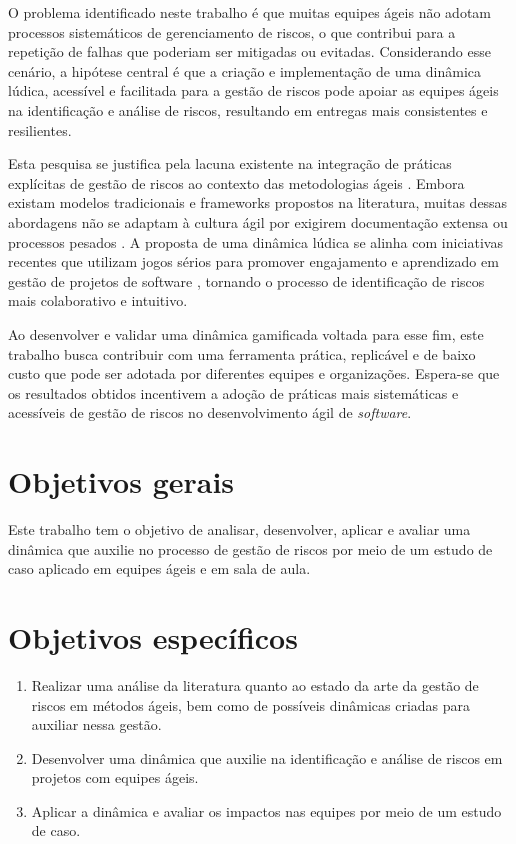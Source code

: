 \documentclass[
	12pt,
	openright,
	twoside,
	a4paper,
	english,
	brazil
	]{abntex2}
\begin{document}
O problema identificado neste trabalho é que muitas equipes ágeis não adotam processos sistemáticos de gerenciamento de riscos, o que contribui para a repetição de falhas que poderiam ser mitigadas ou evitadas. Considerando esse cenário, a hipótese central é que a criação e implementação de uma dinâmica lúdica, acessível e facilitada para a gestão de riscos pode apoiar as equipes ágeis na identificação e análise de riscos, resultando em entregas mais consistentes e resilientes.

Esta pesquisa se justifica pela lacuna existente na integração de práticas explícitas de gestão de riscos ao contexto das metodologias ágeis \cite{LopesSamueldeSouza2022ARMF}. Embora existam modelos tradicionais e frameworks propostos na literatura, muitas dessas abordagens não se adaptam à cultura ágil por exigirem documentação extensa ou processos pesados \cite{Gold}. A proposta de uma dinâmica lúdica se alinha com iniciativas recentes que utilizam jogos sérios para promover engajamento e aprendizado em gestão de projetos de software \cite{SERGE, Caponetto, Alomari}, tornando o processo de identificação de riscos mais colaborativo e intuitivo.

Ao desenvolver e validar uma dinâmica gamificada voltada para esse fim, este trabalho busca contribuir com uma ferramenta prática, replicável e de baixo custo que pode ser adotada por diferentes equipes e organizações. Espera-se que os resultados obtidos incentivem a adoção de práticas mais sistemáticas e acessíveis de gestão de riscos no desenvolvimento ágil de \textit{software}.

\section{Objetivos gerais}

Este trabalho tem o objetivo de analisar, desenvolver, aplicar e avaliar uma dinâmica que auxilie no processo de gestão de riscos por meio de um estudo de caso aplicado em equipes ágeis e em sala de aula.

\section{Objetivos específicos}

\begin{enumerate}
  \item Realizar uma análise da literatura quanto ao estado da arte da gestão de riscos em métodos ágeis, bem como de possíveis dinâmicas criadas para auxiliar nessa gestão.
  \item Desenvolver uma dinâmica que auxilie na identificação e análise de riscos em projetos com equipes ágeis.
  \item Aplicar a dinâmica e avaliar os impactos nas equipes por meio de um estudo de caso.
\end{enumerate}
\end{document}
